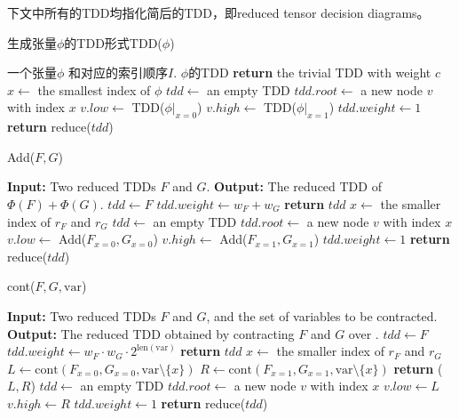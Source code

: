 下文中所有的TDD均指化简后的TDD，即reduced tensor decision diagrams。
\begin{algorithm}
    \caption{生成张量\(\phi\)的TDD形式TDD(\(\phi\))}
    \begin{algorithmic}[1]
    \Require 一个张量\(\phi\) 和对应的索引顺序\(I\).
    \Ensure \(\phi\)的TDD
        \State \textbf{return} the trivial TDD with weight \(c\)
    \EndIf
    \State \(x \leftarrow\) the smallest index of \(\phi\)
    \State \(tdd \leftarrow\) an empty TDD
    \State \(tdd.root \leftarrow\) a new node \(v\) with index \(x\)
    \State \(v.low \leftarrow\) TDD(\(\phi|_{x=0}\))
    \State \(v.high \leftarrow\) TDD(\(\phi|_{x=1}\))
    \State \(tdd.weight \leftarrow 1\)
    \State \textbf{return} reduce(\(tdd\))
    \end{algorithmic}
\end{algorithm}
\begin{algorithm}
\caption{Add(\(F, G\))}
\begin{algorithmic}[1]
\State \textbf{Input:} Two reduced TDDs \(F\) and \(G\).
\State \textbf{Output:} The reduced TDD of \(\Phi(F) + \Phi(G)\).
    \State \(tdd \leftarrow F\)
    \State \(tdd.weight \leftarrow w_F + w_G\)
    \State \textbf{return} \(tdd\)
\EndIf
\State \(x \leftarrow\) the smaller index of \(r_F\) and \(r_G\)
\State \(tdd \leftarrow\) an empty TDD
\State \(tdd.root \leftarrow\) a new node \(v\) with index \(x\)
\State \(v.low \leftarrow\) Add(\(F_{x=0}, G_{x=0}\))
\State \(v.high \leftarrow\) Add(\(F_{x=1}, G_{x=1}\))
\State \(tdd.weight \leftarrow 1\)
\State \textbf{return} reduce(\(tdd\))
\end{algorithmic}
\end{algorithm}
\begin{algorithm}
\caption{cont(\(F, G, \text{var}\))}
\begin{algorithmic}[1]
\State \textbf{Input:} Two reduced TDDs \(F\) and \(G\), and the set  of variables to be contracted.
\State \textbf{Output:} The reduced TDD obtained by contracting \(F\) and \(G\) over .
    \State \(tdd \leftarrow F\)
    \State \(tdd.weight \leftarrow w_F \cdot w_G \cdot 2^{\text{len}(\text{var})}\)
    \State \textbf{return} \(tdd\)
\EndIf
\State \(x \leftarrow\) the smaller index of \(r_F\) and \(r_G\)
\State \(L \leftarrow \text{cont}(F_{x=0}, G_{x=0}, \text{var}\setminus\{x\})\)
\State \(R \leftarrow \text{cont}(F_{x=1}, G_{x=1}, \text{var}\setminus\{x\})\)
    \State \textbf{return} (\(L, R\))
\Else
    \State \(tdd \leftarrow\) an empty TDD
    \State \(tdd.root \leftarrow\) a new node \(v\) with index \(x\)
    \State \(v.low \leftarrow L\)
    \State \(v.high \leftarrow R\)
    \State \(tdd.weight \leftarrow 1\)
    \State \textbf{return} reduce(\(tdd\))
\EndIf
\end{algorithmic}
\end{algorithm}
